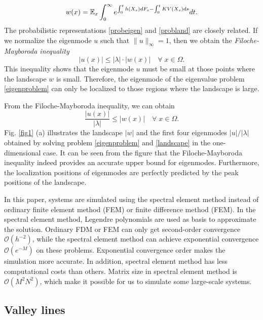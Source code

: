 \documentclass[a4paper,11pt]{article}
\begin{document}
\begin{equation}\label{probland}
w(x) = \mathbb{E}_x \int_{0}^{\infty} e^{\int_{0}^{t} h(X_s) d F_s - \int_{0}^{t} KV(X_s) ds} dt.
\end{equation}
The probabilistic representations \eqref{probeigen} and \eqref{probland} are closely related. If we normalize the eigenmode $u$ such that $\|u\|_\infty = 1$, then we obtain the \emph{Filoche-Mayboroda inequality}
\begin{equation*}
|u(x)| \leq |\lambda| \cdot |w(x)| \quad \forall \; x \in \Omega.
\end{equation*}
This inequality shows that the eigenmode $u$ must be small at those points where the landscape $w$ is small. Therefore, the eigenmode of the eigenvalue problem \eqref{eigenproblem} can only be localized to those regions where the landscape is large.

From the Filoche-Mayboroda inequality, we can obtain
\begin{equation*}
\frac{|u(x)|}{|\lambda|} \leq |w(x)| \quad \forall \; x \in \Omega.
\end{equation*}
Fig. \ref{fig1} (a) illustrates the landscape $|w|$ and the first four eigenmodes $|u| / |\lambda|$ obtained by solving problem \eqref{eigenproblem} and \eqref{landscape} in the one-dimensional case. It can be seen from the figure that the Filoche-Mayboroda inequality indeed provides an accurate upper bound for eigenmodes. Furthermore, the localization positions of eigenmodes are perfectly predicted by the peak positions of the landscape.

\begin{remark}
In this paper, systems are simulated using the spectral element method instead of ordinary finite element method (FEM) or finite difference method (FEM). In the spectral element method, Legendre polynomials are used as basis to approximate the solution. Ordinary FDM or FEM can only get second-order convergence $\mathcal{O}(h^{-2})$, while the spectral element method can achieve exponential convergence $\mathcal{O}(e^{-M})$ on these problems. Exponential convergence order makes the simulation more accurate. In addition, spectral element method has less computational costs than others. Matrix size in spectral element method is $\mathcal{O}(M^2 N^2)$, which make it possible for us to simulate some large-scale systems.
\end{remark}

\subsection{Valley lines}
\end{document}
